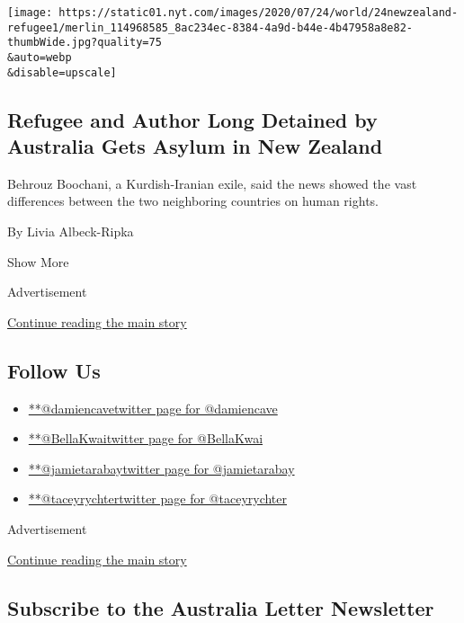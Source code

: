 \begin{enumerate}
  \texttt{[image: https://static01.nyt.com/images/2020/07/24/world/24newzealand-refugee1/merlin\_114968585\_8ac234ec-8384-4a9d-b44e-4b47958a8e82-thumbWide.jpg?quality=75\\\&auto=webp\\\&disable=upscale]}

  \hypertarget{refugee-and-author-long-detained-by-australia-gets-asylum-in-new-zealand}{%
  \subsection{Refugee and Author Long Detained by Australia Gets Asylum
  in New
  Zealand}\label{refugee-and-author-long-detained-by-australia-gets-asylum-in-new-zealand}}

  Behrouz Boochani, a Kurdish-Iranian exile, said the news showed the
  vast differences between the two neighboring countries on human
  rights.

  By Livia Albeck-Ripka
\end{enumerate}

Show More

Advertisement

\protect\hyperlink{after-mid1}{Continue reading the main story}

\hypertarget{follow-us}{%
\subsection{Follow Us}\label{follow-us}}

\begin{itemize}
\tightlist
\item
  \href{https://twitter.com/damiencave}{**@damiencavetwitter page for
  @damiencave}
\item
  \href{https://twitter.com/BellaKwai}{**@BellaKwaitwitter page for
  @BellaKwai}
\item
  \href{https://twitter.com/jamietarabay}{**@jamietarabaytwitter page
  for @jamietarabay}
\item
  \href{https://twitter.com/taceyrychter}{**@taceyrychtertwitter page
  for @taceyrychter}
\end{itemize}

Advertisement

\protect\hyperlink{after-mktg}{Continue reading the main story}

\hypertarget{subscribe-to-the-australia-letter-newsletter}{%
\subsection{Subscribe to the Australia Letter
Newsletter}\label{subscribe-to-the-australia-letter-newsletter}}

